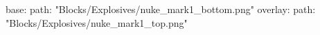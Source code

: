 base:
  path: "Blocks/Explosives/nuke_mark1_bottom.png"
overlay:
  path: "Blocks/Explosives/nuke_mark1_top.png"